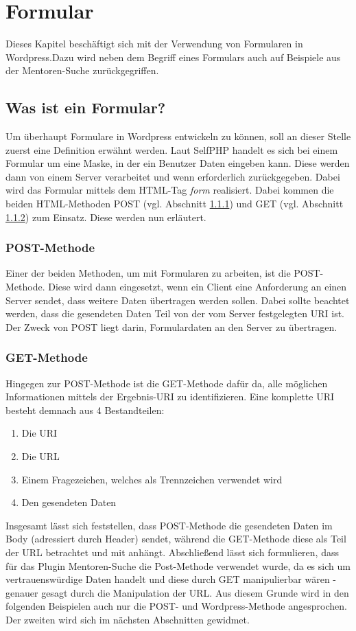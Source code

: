 \section{Formular}\label{Formular}
Dieses Kapitel beschäftigt sich mit der Verwendung von Formularen in Wordpress.Dazu wird neben dem Begriff eines Formulars auch auf Beispiele aus der Mentoren-Suche zurückgegriffen. 
\subsection{Was ist ein Formular?}
Um überhaupt Formulare in Wordpress entwickeln zu können, soll an dieser Stelle zuerst eine Definition erwähnt werden. \newline
Laut SelfPHP handelt es sich bei einem Formular um eine Maske, in der ein Benutzer Daten eingeben kann. Diese werden dann von einem Server verarbeitet und wenn erforderlich zurückgegeben. Dabei wird das Formular mittels dem HTML-Tag \emph{form} realisiert. Dabei kommen die beiden HTML-Methoden POST (vgl. Abschnitt \ref{post}) und GET (vgl. Abschnitt \ref{get}) zum Einsatz. 
Diese werden nun erläutert.
\subsubsection{POST-Methode}\label{post}
Einer der beiden Methoden, um mit Formularen zu arbeiten, ist die POST-Methode. Diese wird dann eingesetzt, wenn ein Client eine Anforderung an einen Server sendet, dass weitere Daten übertragen werden sollen. Dabei sollte beachtet werden, dass die gesendeten Daten Teil von der vom Server festgelegten \gls{URI} ist.\newline
Der Zweck von POST liegt darin, Formulardaten an den Server zu übertragen. 
\subsubsection{GET-Methode}\label{get}
Hingegen zur POST-Methode ist die GET-Methode dafür da, alle möglichen Informationen mittels der Ergebnis-\gls{URI} zu identifizieren. Eine komplette \gls{URI} besteht demnach aus 4 Bestandteilen:
\begin{enumerate}
	\item Die \gls{URI}
	\item Die \gls{URL}
	\item Einem Fragezeichen, welches als Trennzeichen verwendet wird
	\item Den gesendeten Daten
\end{enumerate}
Insgesamt lässt sich feststellen, dass POST-Methode die gesendeten Daten im Body (adressiert durch Header) sendet, während die GET-Methode diese als Teil der \gls{URL} betrachtet und mit anhängt.\newline
Abschließend lässt sich formulieren, dass für das Plugin Mentoren-Suche die Post-Methode verwendet wurde, da es sich um vertrauenswürdige Daten handelt und diese durch GET manipulierbar wären - genauer gesagt durch die Manipulation der \gls{URL}. Aus diesem Grunde wird in den folgenden Beispielen auch nur die POST- und Wordpress-Methode angesprochen. Der zweiten wird sich im nächsten Abschnitten gewidmet.
